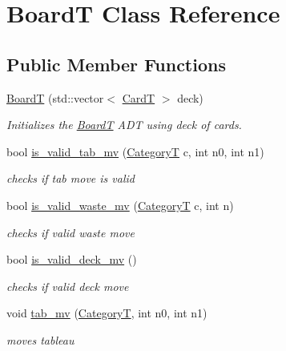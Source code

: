 \hypertarget{class_board_t}{}\section{BoardT Class Reference}
\label{class_board_t}
\subsection*{Public Member Functions}
\begin{DoxyCompactItemize}
\item 
\hyperlink{class_board_t_a4a25fcb5e2e968e11d50bf6c1bb763a1}{BoardT} (std\+::vector$<$ \hyperlink{struct_card_t}{CardT} $>$ deck)
\begin{DoxyCompactList}\small\item\em Initializes the \hyperlink{class_board_t}{BoardT} A\+DT using deck of cards. \end{DoxyCompactList}\item 
bool \hyperlink{class_board_t_a6409bf4971cf3d42847ac1cd75e93b96}{is\+\_\+valid\+\_\+tab\+\_\+mv} (\hyperlink{_card_types_8h_aa77f81f8d4c8aa57046a50ca32d6b7b4}{CategoryT} c, int n0, int n1)
\begin{DoxyCompactList}\small\item\em checks if tab move is valid \end{DoxyCompactList}\item 
bool \hyperlink{class_board_t_a4b24b85d614d7193a36e5a4847040070}{is\+\_\+valid\+\_\+waste\+\_\+mv} (\hyperlink{_card_types_8h_aa77f81f8d4c8aa57046a50ca32d6b7b4}{CategoryT} c, int n)
\begin{DoxyCompactList}\small\item\em checks if valid waste move \end{DoxyCompactList}\item 
bool \hyperlink{class_board_t_affe6cfc5c246bcfa0afd59476c70db8c}{is\+\_\+valid\+\_\+deck\+\_\+mv} ()
\begin{DoxyCompactList}\small\item\em checks if valid deck move \end{DoxyCompactList}\item 
void \hyperlink{class_board_t_a0237cb23110709f280aecb68728fd05b}{tab\+\_\+mv} (\hyperlink{_card_types_8h_aa77f81f8d4c8aa57046a50ca32d6b7b4}{CategoryT}, int n0, int n1)
\begin{DoxyCompactList}\small\item\em moves tableau \end{DoxyCompactList}\item 

\end{DoxyCompactItemize}
